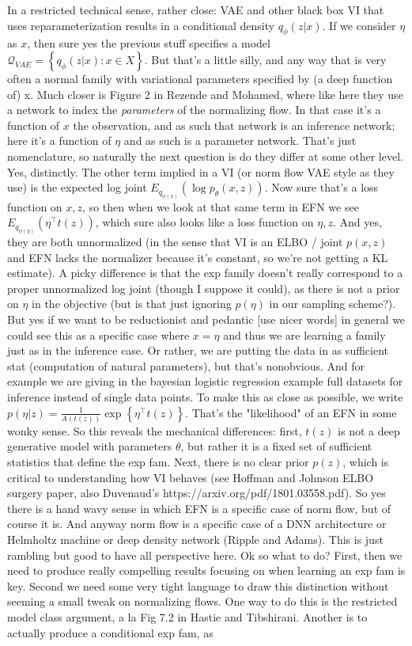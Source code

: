 \documentclass{article}
\begin{document}
In a restricted technical sense, rather close: VAE and other black box VI that uses reparameterization results in a conditional density $q_\phi( z | x)$.  If we consider $\eta$ as $x$, then sure yes the previous stuff specifies a model $\mathcal{Q}_{VAE} = \left\{q_\phi(z|x) : x \in X\right\}$.  But that's a little silly, and any way that is very often a normal family with variational parameters specified by (a deep function of) x.  Much closer is Figure 2 in Rezende and Mohamed, where like here they use a network to index the \emph{parameters} of the normalizing flow.  In that case it's a function of $x$ the observation, and as such that network is an inference network; here it's a function of $\eta$ and as such is a parameter network.  That's just nomenclature, so naturally the next question is do they differ at some other level.  Yes, distinctly.  The other term implied in a VI (or norm flow VAE style as they use) is the expected log joint $E_{q_{\phi(x)}}  \left( \log p_\theta(x,z)\right)$.  Now sure that's a loss function on $x,z$, so then when we look at that same term in EFN we see   $E_{q_{\phi(\eta)}}  \left( \eta^\top t(z) \right)$, which sure also looks like a loss function on $\eta,z$.  And yes, they are both unnormalized (in the sense that VI is an ELBO / joint $p(x,z)$ and EFN lacks the normalizer because it's constant, so we're not getting a KL estimate).  A picky difference is that the exp family doesn't really correspond to a proper unnormalized log joint (though I suppose it could), as there is not a prior on $\eta$ in the objective (but is that just ignoring $p(\eta)$ in our sampling scheme?). But yes if we want to be reductionist and pedantic [use nicer words] in general we could see this as a specific case where $x=\eta$ and thus we are learning a family just as in the inference case.  Or rather, we are putting the data in as sufficient stat (computation of natural parameters), but that's nonobvious.  And for example we are giving in the bayesian logistic regression example full datasets for inference instead of single data points.  To make this as close as possible, we write $p(\eta | z)  = \frac{1}{A(t(z))} \exp\left\{ \eta^\top t(z)\right\}$.  That's the "likelihood" of an EFN in some wonky sense.  So this reveals the mechanical differences: first, $t(z)$ is not a deep generative model with parameters $\theta$, but rather it is a fixed set of sufficient statistics that define the exp fam.  Next, there is no clear prior $p(z)$, which is critical to understanding how VI behaves (see Hoffman and Johnson ELBO surgery paper, also Duvenaud's https://arxiv.org/pdf/1801.03558.pdf).  So yes there is a hand wavy sense in which EFN is a specific case of norm flow, but of course it is.  And anyway norm flow is a specific case of a DNN architecture or Helmholtz machine or deep density network (Ripple and Adams).  This is just rambling but good to have all perspective here.  Ok so what to do?  First, then we need to produce really compelling results focusing on when learning an exp fam is key.  Second we need some very tight language to draw this distinction without seeming a small tweak on normalizing flows.  One way to do this is the restricted model class argument, a la Fig 7.2 in Hastie and Tibshirani.  Another is to actually produce a conditional exp fam, as 
\end{document}
